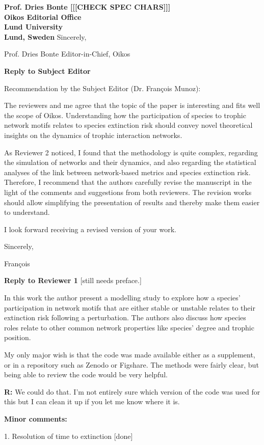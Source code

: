 \documentclass[12pt]{letter}
\begin{document}
\begin{letter}{\bf Prof. Dries Bonte [[[CHECK SPEC CHARS]]]\\
Oikos Editorial Office \\
Lund University \\
Lund, Sweden}
Sincerely,

Prof. Dries Bonte
Editor-in-Chief, Oikos




\clearpage

\Large{\textbf{Reply to Subject Editor}}


  Recommendation by the Subject Editor (Dr. François Munoz):

  The reviewers and me agree that the topic of the paper is interesting and fits well the scope of Oikos.
  Understanding how the participation of species to trophic network motifs relates to species extinction risk should convey novel theoretical insights on the dynamics of trophic interaction networks.

  As Reviewer 2 noticed, I found that the methodology is quite complex, regarding the simulation of networks and their dynamics, and also regarding the statistical analyses of the link between network-based metrics and species extinction risk.
  Therefore, I recommend that the authors carefully revise the manuscript in the light of the comments and suggestions from both reviewers. The revision works should allow simplifying the presentation of results and thereby make them easier to understand.

  I look forward receiving a revised version of your work.

  Sincerely,

  François

\clearpage

\Large{\textbf{Reply to Reviewer 1}} [still needs preface.]

  In this work the author present a modelling study to explore how a species' participation in network motifs that are either stable or unstable relates to their extinction risk following a perturbation. The authors also discuss how species roles relate to other common network properties like species' degree and trophic position. 

  My only major wish is that the code was made available either as a supplement, or in a repository such as Zenodo or Figshare. The methods were fairly clear, but being able to review the code would be very helpful.


  \textbf{R:}  
  We could do that. I'm not entirely sure which version of the code was used for this but I can clean it up if you let me know where it is.


  \textbf{Minor comments:}

  1. Resolution of time to extinction [done]



\end{letter}
\end{document}
